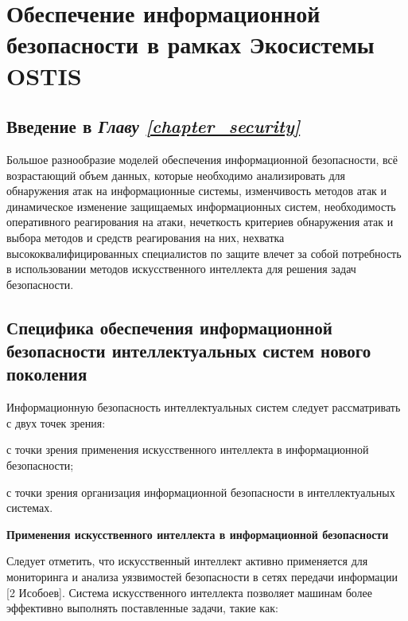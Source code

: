 \chapter{Обеспечение информационной безопасности в рамках Экосистемы OSTIS}
\label{chapter_security}


\section*{Введение в \textit{Главу \ref{chapter_security}}}
Большое разнообразие моделей обеспечения информационной безопасности, всё возрастающий объем данных, которые необходимо анализировать для обнаружения атак на информационные системы, изменчивость методов атак и динамическое изменение защищаемых информационных систем, необходимость оперативного реагирования на атаки, нечеткость критериев обнаружения атак и выбора методов и средств реагирования на них, нехватка высококвалифицированных специалистов по защите влечет за собой потребность в использовании методов искусственного интеллекта для решения задач безопасности.

\section{Специфика обеспечения информационной безопасности интеллектуальных систем нового поколения}
Информационную безопасность интеллектуальных систем следует рассматривать с двух точек зрения:
\begin{textitemize}
	\item с точки зрения применения искусственного интеллекта в информационной безопасности;
	\item с точки зрения организация информационной безопасности в интеллектуальных системах.
\end{textitemize}

\textbf{Применения искусственного интеллекта в информационной безопасности}

Следует отметить, что искусственный интеллект активно применяется для мониторинга и анализа уязвимостей безопасности в сетях передачи информации {[}2 Исобоев{]}. Система искусственного интеллекта позволяет машинам более эффективно выполнять поставленные задачи, такие как:

